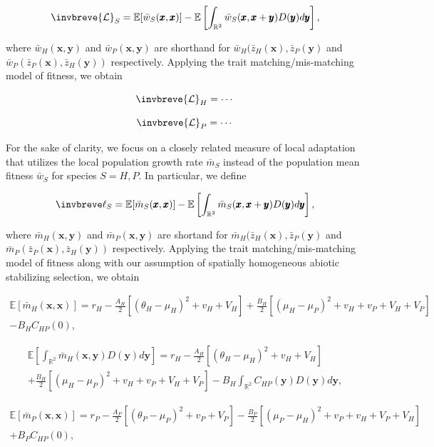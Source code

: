 \documentclass{article}
\begin{document}
\[\invbreve{\mathcal L}_S=\mathbb E[\bar w_S(\pmb x,\pmb x)]-\mathbb E\left[\int_{\mathbb R^2}\bar w_S(\pmb x,\pmb x+\pmb y)D(\pmb y)d\pmb y\right],\]

where \(\bar w_H(\pmb x,\pmb y)\) and \(\bar w_P(\pmb x,\pmb y)\) are
shorthand for \(\bar w_H(\bar z_H(\pmb x),\bar z_P(\pmb y)\) and
\(\bar w_P(\bar z_P(\pmb x),\bar z_H(\pmb y))\) respectively. Applying
the trait matching/mis-matching model of fitness, we obtain

\[\invbreve{\mathcal L}_H=\cdots\]

\[\invbreve{\mathcal L}_P=\cdots\]

For the sake of clarity, we focus on a closely related measure of local
adaptation that utilizes the local population growth rate \(\bar m_S\)
instead of the population mean fitness \(\bar w_S\) for species
\(S=H,P\). In particular, we define

\[\invbreve\ell_S=\mathbb E[\bar m_S(\pmb x,\pmb x)]-\mathbb E\left[\int_{\mathbb R^2}\bar m_S(\pmb x,\pmb x+\pmb y)D(\pmb y)d\pmb y\right],\]

where \(\bar m_H(\pmb x,\pmb y)\) and \(\bar m_P(\pmb x,\pmb y)\) are
shortand for \(\bar m_H(\bar z_H(\pmb x),\bar z_P(\pmb y)\) and
\(\bar m_P(\bar z_P(\pmb x),\bar z_H(\pmb y))\) respectively. Applying
the trait matching/mis-matching model of fitness along with our
assumption of spatially homogeneous abiotic stabilizing selection, we
obtain

\begin{multline}
  \mathbb E[\bar m_H(\pmb x,\pmb x)]=
  r_H-\frac{A_H}{2}[(\theta_H-\mu_H)^2+v_H+V_H]
  +\frac{B_H}{2}[(\mu_H-\mu_P)^2+v_H+v_P+V_H+V_P] \\
  -B_HC_{HP}(0),
\end{multline}

\begin{multline}
  \mathbb E\left[\int_{\mathbb R^2}\bar m_H(\pmb x,\pmb y)
  D(\pmb y)d\pmb y\right]= 
  r_H-\frac{A_H}{2}[(\theta_H-\mu_H)^2+v_H+V_H] \\
  +\frac{B_H}{2}[(\mu_H-\mu_P)^2+v_H+v_P+V_H+V_P]
  -B_H\int_{\mathbb R^2}C_{HP}(\pmb y)D(\pmb y)d\pmb y,
\end{multline}

\begin{multline}
  \mathbb E[\bar m_P(\pmb x,\pmb x)]=
  r_P-\frac{A_P}{2}[(\theta_P-\mu_P)^2+v_P+V_P]
  -\frac{B_P}{2}[(\mu_P-\mu_H)^2+v_P+v_H+V_P+V_H] \\
  +B_P C_{HP}(0),
\end{multline}
\end{document}
